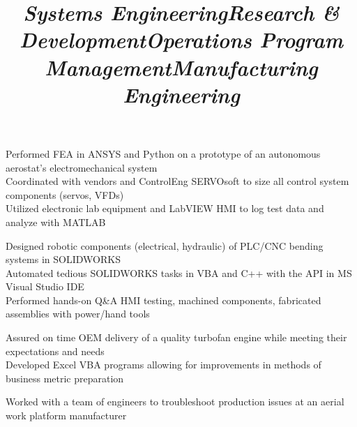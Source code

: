 \documentclass[mm]{res}
\newcommand{\tb}{\textbullet \xspace}
\begin{document}
\begin{resume}
\title{\textsl{Systems Engineering}}
\begin{position}
\tb Performed FEA in ANSYS and Python on a prototype of an autonomous aerostat's electromechanical system \\
\tb Coordinated with vendors and ControlEng SERVOsoft to size all control system components (servos, VFDs) \\
\tb Utilized electronic lab equipment and LabVIEW HMI to log test data and analyze with MATLAB
\end{position}

\title{\textsl{Research \& Development}}
\begin{position}
\tb Designed robotic components (electrical, hydraulic) of PLC/CNC bending systems in SOLIDWORKS \\
\tb Automated tedious SOLIDWORKS tasks in VBA and C++ with the API in MS Visual Studio IDE \\
\tb Performed hands-on Q\&A HMI testing, machined components, fabricated assemblies with power/hand tools
\end{position}

\title{\textsl{Operations Program Management}}
\begin{position}
\tb Assured on time OEM delivery of a quality turbofan engine while meeting their expectations and needs \\
\tb Developed Excel VBA programs allowing for improvements in methods of business metric preparation
\end{position}

\title{\textsl{Manufacturing Engineering}}
\begin{position}
\tb Worked with a team of engineers to troubleshoot production issues at an aerial work platform manufacturer
\end{position}


\end{resume}
\end{document}
